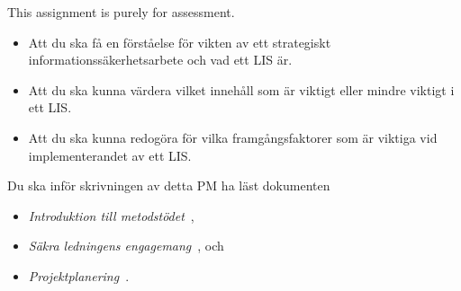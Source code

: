 This assignment is purely for assessment.

\begin{itemize}
\item Att du ska få en förståelse för vikten av ett strategiskt 
  infor\-mations\-säker\-hets\-ar\-be\-te och vad ett LIS är.
\item Att du ska kunna värdera vilket innehåll som är viktigt eller mindre 
viktigt i ett LIS\@.
\item Att du ska kunna redogöra för vilka framgångsfaktorer som är viktiga vid 
implementerandet av ett LIS\@.
\end{itemize}

Du ska inför skrivningen av detta PM ha läst dokumenten
\begin{itemize}
  \item \emph{Introduktion till metodstödet}~\cite{MSB2011itm},
  \item \emph{Säkra ledningens engagemang}~\cite{MSB2011sle}, och
  \item \emph{Projektplanering}~\cite{MSB2011p}.
\end{itemize}

